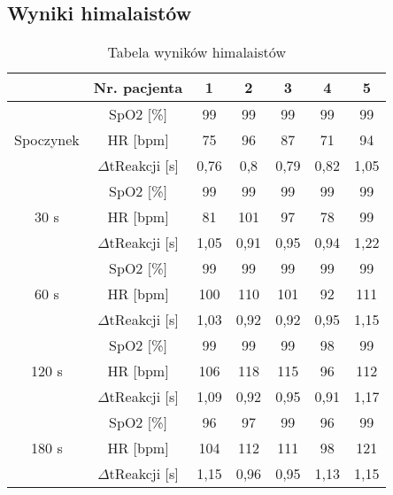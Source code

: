 \subsection{Wyniki himalaistów}
\begin{table}[ht]
    \centering
    \caption{Tabela wyników himalaistów}
    \begin{tabular}{|c|c|c|c|c|c|c|}
        \hline
                              & Nr. pacjenta        & 1 & 2 & 3 & 4 & 5 \\ \hline
        \multirow{3}{*}{Spoczynek}  & SpO2 $[$\%$]$ & 99   & 99  & 99  & 99  & 99  \\ \cline{2-7} 
                              & HR $[$bpm$]$     & 75  & 96  & 87  & 71  &  94 \\ \cline{2-7} 
                              & $\Delta$tReakcji $[$s$]$  & 0,76  & 0,8  & 0,79  & 0,82  & 1,05  \\ \hline
        \multirow{3}{*}{30 s}  & SpO2 $[$\%$]$ &  99 & 99  &  99 & 99  &  99 \\ \cline{2-7} 
                              & HR $[$bpm$]$     & 81  &  101 & 97  & 78  & 99  \\ \cline{2-7} 
                              & $\Delta$tReakcji $[$s$]$   & 1,05  & 0,91  & 0,95  & 0,94  & 1,22  \\ \hline
        \multirow{3}{*}{60 s}  & SpO2 $[$\%$]$ & 99  & 99  & 99  & 99  & 99  \\ \cline{2-7} 
                              & HR $[$bpm$]$   & 100  & 110  & 101  & 92  & 111  \\ \cline{2-7} 
                              & $\Delta$tReakcji $[$s$]$   & 1,03  & 0,92  & 0,92  & 0,95  & 1,15  \\ \hline
        \multirow{3}{*}{120 s}  & SpO2 $[$\%$]$ & 99  & 99  & 99  & 98  & 99  \\ \cline{2-7} 
                              & HR $[$bpm$]$     & 106  & 118  & 115  & 96  & 112  \\ \cline{2-7} 
                              & $\Delta$tReakcji $[$s$]$   & 1,09  & 0,92  & 0,95  & 0,91  & 1,17  \\ \hline
        \multirow{3}{*}{180 s} & SpO2 $[$\%$]$ &  96 & 97  & 99  & 96  & 99  \\ \cline{2-7} 
                              & HR $[$bpm$]$     &  104 & 112  & 111  & 98  & 121  \\ \cline{2-7} 
                              & $\Delta$tReakcji $[$s$]$   & 1,15  & 0,96  & 0,95  & 1,13  & 1,15  \\ \hline

\end{tabular}
\end{table}
